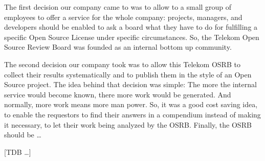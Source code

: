 The first decision our company came to was to allow to a small group of
employees to offer a service for the whole company: projects, managers, and
developers should be enabled to ask a board what they have to do for fulfilling
a specific Open Source License under specific circumstances. So, the Telekom
Open Source Review Board was founded as an internal bottom up community.

The second decision our company took was to allow this Telekom OSRB to collect
their results systematically and to publish them in the style of an Open Source
project. The idea behind that decision was simple: The more the internal service
would become known, there more work would be generated. And normally, more work
means more man power. So, it was a good cost saving idea, to enable the
requestors to find their answers in a compendium instead of making it necessary,
to let their work being analyzed by the OSRB. Finally, the OSRB should be \ldots






[TDB \ldots]

%
